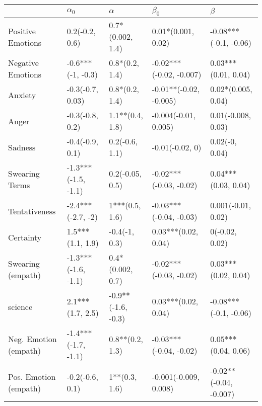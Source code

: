 \begin{tabular}{lllll}
\toprule
{} &           $\alpha_0$ &            $\alpha$ &                $\beta_0$ &                 $\beta$ \\
\midrule
Positive Emotions     &       0.2(-0.2, 0.6) &    0.7*(0.002, 1.4) &       0.01*(0.001, 0.02) &   -0.08***(-0.1, -0.06) \\
Negative Emotions     &    -0.6***(-1, -0.3) &      0.8*(0.2, 1.4) &  -0.02***(-0.02, -0.007) &     0.03***(0.01, 0.04) \\
Anxiety               &     -0.3(-0.7, 0.03) &      0.8*(0.2, 1.4) &   -0.01**(-0.02, -0.005) &      0.02*(0.005, 0.04) \\
Anger                 &      -0.3(-0.8, 0.2) &     1.1**(0.4, 1.8) &     -0.004(-0.01, 0.005) &      0.01(-0.008, 0.03) \\
Sadness               &      -0.4(-0.9, 0.1) &      0.2(-0.6, 1.1) &          -0.01(-0.02, 0) &          0.02(-0, 0.04) \\
Swearing Terms        &  -1.3***(-1.5, -1.1) &     0.2(-0.05, 0.5) &   -0.02***(-0.03, -0.02) &     0.04***(0.03, 0.04) \\
Tentativeness         &    -2.4***(-2.7, -2) &      1***(0.5, 1.6) &   -0.03***(-0.04, -0.03) &      0.001(-0.01, 0.02) \\
Certainty             &     1.5***(1.1, 1.9) &       -0.4(-1, 0.3) &      0.03***(0.02, 0.04) &          0(-0.02, 0.02) \\
Swearing (empath)     &  -1.3***(-1.6, -1.1) &    0.4*(0.002, 0.7) &   -0.02***(-0.03, -0.02) &     0.03***(0.02, 0.04) \\
science               &     2.1***(1.7, 2.5) &  -0.9**(-1.6, -0.3) &      0.03***(0.02, 0.04) &   -0.08***(-0.1, -0.06) \\
Neg. Emotion (empath) &  -1.4***(-1.7, -1.1) &     0.8**(0.2, 1.3) &   -0.03***(-0.04, -0.02) &     0.05***(0.04, 0.06) \\
Pos. Emotion (empath) &      -0.2(-0.6, 0.1) &       1**(0.3, 1.6) &    -0.001(-0.009, 0.008) &  -0.02**(-0.04, -0.007) \\
\bottomrule
\end{tabular}
